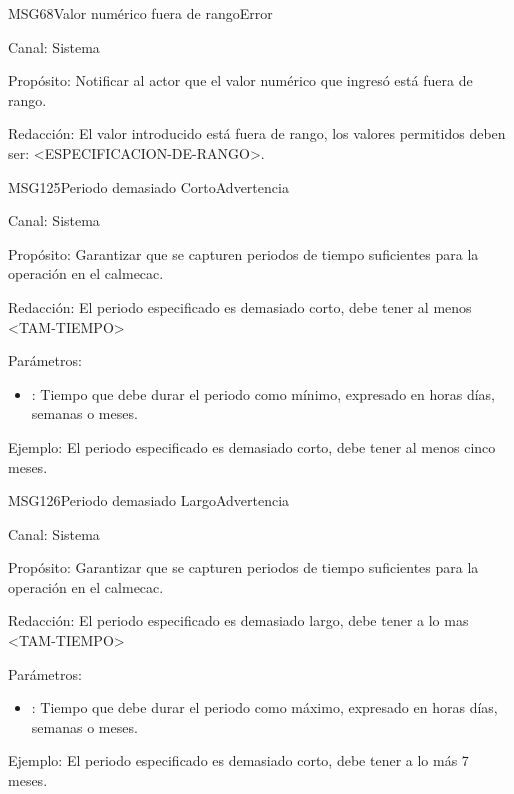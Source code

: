 \begin{mensaje}{MSG68}{Valor numérico fuera de rango}{Error}
	\item[Canal:] Sistema
	\item[Propósito:] Notificar al actor que el valor numérico que ingresó está fuera de rango.
	\item[Redacción:] El valor introducido está fuera de rango, los valores permitidos deben ser: <ESPECIFICACION-DE-RANGO>.
\end{mensaje}


\begin{mensaje}{MSG125}{Periodo demasiado Corto}{Advertencia}
	\item[Canal:] Sistema
	\item[Propósito:] Garantizar que se capturen periodos de tiempo suficientes para la operación en el calmecac.
	\item[Redacción:] El periodo especificado es demasiado corto, debe tener al menos <TAM-TIEMPO> 
	\item[Parámetros:] \cdtEmpty	
        \begin{itemize}
        	\item <TAM-TIEMPO>: Tiempo que debe durar el periodo como mínimo, expresado en horas días, semanas o meses.
        \end{itemize}
	\item[Ejemplo:] El periodo especificado es demasiado corto, debe tener al menos cinco meses.
\end{mensaje}

\begin{mensaje}{MSG126}{Periodo demasiado Largo}{Advertencia}
	\item[Canal:] Sistema
	\item[Propósito:] Garantizar que se capturen periodos de tiempo suficientes para la operación en el calmecac.
	\item[Redacción:] El periodo especificado es demasiado largo, debe tener a lo mas <TAM-TIEMPO> 
	\item[Parámetros:] \cdtEmpty	
        \begin{itemize}
        	\item <TAM-TIEMPO>: Tiempo que debe durar el periodo como máximo, expresado en horas días, semanas o meses.
        \end{itemize}
	\item[Ejemplo:] El periodo especificado es demasiado corto, debe tener a lo más 7 meses.
\end{mensaje}

